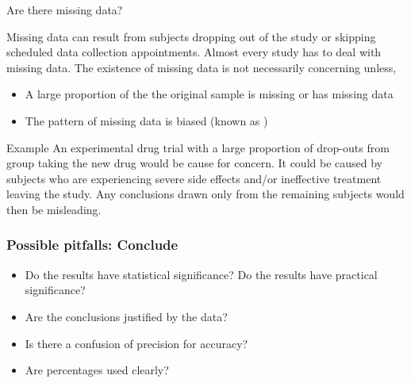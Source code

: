 \documentclass[xcolor=table, aspectratio=169, bigger, handout]{beamer}
\begin{document}
\begin{frame}{Are there missing data?}

\begin{block}{}
Missing data can result from subjects dropping out of the study or skipping scheduled data collection appointments. Almost every study has to deal with missing data. The existence of missing data is not necessarily concerning unless,
\begin{itemize}
\item A large proportion of the the original sample is missing or has missing data
\item The pattern of missing data is biased (known as )
\end{itemize}
\end{block}

\pause
\begin{exampleblock}{Example}
An experimental drug trial with a large proportion of drop-outs from group taking the new drug would be cause for concern. It could be caused by subjects who are experiencing severe side effects and/or ineffective treatment leaving the study. Any conclusions drawn only from the remaining subjects would then be misleading.
\end{exampleblock}
\end{frame}


\begin{frame}
\frametitle{Possible pitfalls: Conclude}

\begin{block}{}
\begin{itemize}
\item Do the results have statistical significance? Do the results have practical significance?
\item Are the conclusions justified by the data?
\item Is there a confusion of precision for accuracy?
\item Are percentages used clearly?
\end{itemize}
\end{block}

\end{frame}
\end{document}
